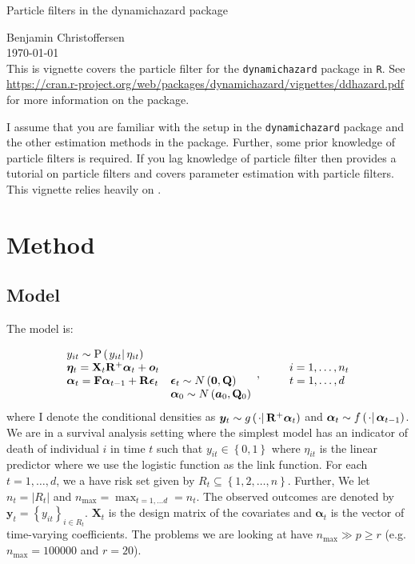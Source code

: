 \documentclass[9pt, notitlepage]{article}
\renewcommand{\vec}[1]{\bm{#1}}
\newcommand{\mat}[1]{\mathbf{#1}}
\newcommand{\Lbrace}[1]{\left\{ #1\right\}}
\newcommand{\Lparen}[1]{\left( #1\right)}
\newcommand{\Cond}[2]{\left. #1 \vphantom{#2} \right\vert  #2}
\newcommand{\Prob}{\text{P}}
\newcommand{\optor}[2]{#1\Lparen{#2}}
\newcommand{\optorC}[3]{\optor{#1}{\Cond{#2}{#3}}}
\newcommand{\propC}[2]{\optorC{\Prob}{#1}{#2}}
\newcommand{\dimState}{p}
\newcommand{\dimRng}{r}
\newcommand{\nPeriods}{d}
\newcommand{\nMax}{n_{\text{max}}}
\newcommand*{\myTitle}{\begingroup
\centering
{\LARGE Particle filters in the dynamichazard package} \\[\baselineskip]
\scshape

Benjamin Christoffersen \\[\baselineskip]
\today \\[\baselineskip]
\vspace*{3\baselineskip}
\endgroup}
\begin{document}
\myTitle
This is vignette covers the particle filter for the \verb|dynamichazard| package in \verb|R|. See \url{https://cran.r-project.org/web/packages/dynamichazard/vignettes/ddhazard.pdf} for more information on the package.

I assume that you are familiar with the setup in the \verb|dynamichazard| package and the other estimation methods in the package. Further, some prior knowledge of particle filters is required.  If you lag knowledge of particle filter then \cite{doucet09} provides a tutorial on particle filters and \cite{kantas15} covers parameter estimation with particle filters. This vignette relies heavily on \cite{fearnhead10}.

\section{Method}
\subsection*{Model}
The model is:

\begin{equation}
\begin{array}{ll}
 	y_{it} \sim \propC{y_{it}}{\eta_{it}} &  \\
%
 	\vec{\eta}_{t} = \mat{X}_t\mat{R}^{+}\vec{\alpha}_t + \vec{o}_t \\
%
 	\vec{\alpha}_t = \mat{F}\vec{\alpha}_{t - 1} + \mat{R}\vec{\epsilon}_t &
 		\vec{\epsilon}_t \sim N\Lparen{\vec{0}, \mat{Q}} \\
%
	&	\vec{\alpha}_0 \sim N\Lparen{\vec{a}_0, \mat{Q}_0}
\end{array}, \qquad
%
\begin{array}{l} i = 1, \dots, n_t \\ t = 1, \dots, d \end{array}
%
\end{equation}%
%
where I  denote the conditional densities as $\vec{y}_t \sim \optorC{g}{\cdot}{\mat{R}^{+}\vec{\alpha}_t}$ and $\vec{\alpha}_t \sim \optorC{f}{\cdot}{\vec{\alpha}_{t-1}}$. We are in a survival analysis setting where the simplest model has an indicator of death of individual $i$ in time $t$ such that $y_{it} \in \Lbrace{0, 1}$ where $\eta_{it}$ is the linear predictor where we use the logistic function as the link function. For each $t=1,\dots,\nPeriods$, we a have risk set given by $R_t \subseteq \Lbrace{1,2,\dots,n}$. Further, We let $n_t = \vert R_t \vert$ and $\nMax = \max_{t = 1,\dots \nPeriods} = n_t$. The observed outcomes are denoted by $\vec{y}_t = \Lbrace{y_{it}}_{i \in R_t}$. $\mat{X}_t$ is the design matrix of the covariates and $\vec{\alpha}_t$ is the vector of time-varying coefficients. The problems we are looking at have $\nMax \gg \dimState \geq \dimRng$ (e.g. $\nMax = 100000$ and $\dimRng = 20$).
\end{document}
